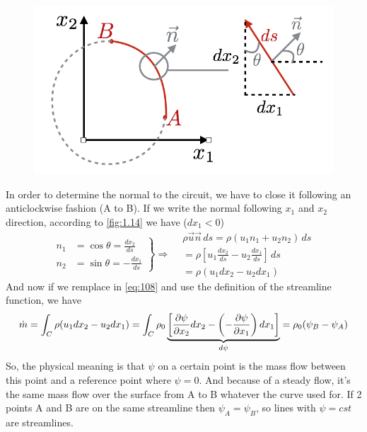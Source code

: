 			\begin{figure}
			\vspace{-5mm}
			\includegraphics[scale=0.4]{ch1/14}
			\label{fig:1.14}
			\end{figure}
			In order to determine the normal to the circuit, we have to close it following an anticlockwise fashion (A to B). If we write the normal following $x_1$ and $x_2$ direction, according to \autoref{fig:1.14} we have ($dx_1<0$)
			\begin{equation}
			\left.
			\begin{aligned}
				n_1 &= \cos \theta = \frac{dx_2}{ds} \\
				n_2 &= \sin \theta = -\frac{dx_1}{ds}
			\end{aligned}
			\right\}
			 \Rightarrow 
			\begin{aligned}
				&\rho \vec{u}\vec{n}\,  ds = \rho (u_1 n_1 + u_2 n_2)\, ds\\
				&= \rho \left[ u_1 \frac{dx_2}{ds} - u_2 \frac{dx_1}{ds} \right]\, ds\\
				&= \rho (u_1 dx_2 - u_2 dx_1)
			\end{aligned}
			\end{equation}
			And now if we remplace in \eqref{eq:108} and use the definition of the streamline function, we have 
			\begin{equation}
				\dot{m} = \int _C \rho (u_1 dx_2 - u_2 dx_1) = \int _C \rho _0 \underbrace{\left[\frac{\D \psi }{\D x_2}dx_2 - \left( -\frac{\D \psi}{\D x_1} \right) dx_1 \right]}_{d\psi} = \rho _0 (\psi _B - \psi _A)
			\end{equation}
			So, the physical meaning is that $\psi$ on a certain point is the mass flow between this point and a reference point where $\psi = 0$. And because of a steady flow, it's the same mass flow over the surface from A to B whatever the curve used for. If 2 points A and B are on the same streamline then $\psi_A = \psi _B$, so lines with $\psi = cst$ are streamlines. 
			
